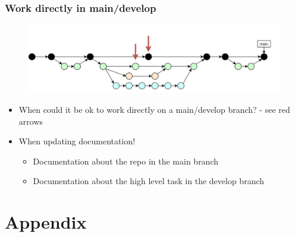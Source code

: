 \documentclass[aspectratio=169]{beamer} %
\begin{document}
\begin{frame}
	\frametitle{Work directly in main/develop}
	
	\vspace{-.5cm}
	\begin{minipage}[t][5cm][t]{\textwidth}
		\begin{figure}
			\centering
			\includegraphics[width=\textwidth]{./img/dime-gitflow-network-workdirectly.png}
		\end{figure}
	\end{minipage}  
	
	\vspace{-.5cm}
	\begin{minipage}[t][5cm][t]{\textwidth}
		\begin{itemize}
			\setlength\itemsep{.5em}
			\item <1->When could it be ok to work directly on a main/develop branch? - see red arrows
			\item <2->When updating documentation!
			\begin{itemize}
				\setlength\itemsep{.5em}
				\item <2->Documentation about the repo in the main branch
				\item <2->Documentation about the high level task in the develop branch
			\end{itemize}
		\end{itemize}
	\end{minipage}  
\end{frame}






\section{Appendix}
\end{document}
